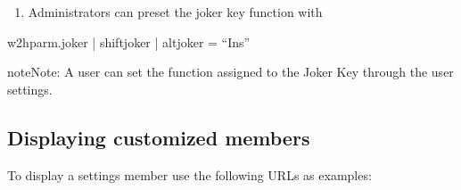 \documentclass[letterpaper,10pt,english]{sphinxmanual}
\begin{document}
\begin{sphinxVerbatim}[commandchars=\\\{\}]
\end{sphinxVerbatim}
\begin{enumerate}
%
\setcounter{enumi}{2}
\item {} 
\sphinxAtStartPar
Administrators can preset the joker key function with

\end{enumerate}
\begin{description}
\sphinxlineitem{::}
\sphinxAtStartPar
w2hparm.joker | shiftjoker | altjoker = “Ins”

\end{description}

\begin{sphinxadmonition}{note}{Note:}
\sphinxAtStartPar
A user can set the function assigned to the Joker Key through the user settings.
\end{sphinxadmonition}

\sphinxAtStartPar
{}

\ignorespaces 

\subsection{Displaying customized members}
\label{\detokenize{Customization:displaying-customized-members}}\label{\detokenize{Customization:index-2}}
\sphinxAtStartPar
To display a settings member use the following URLs as examples:

\begin{sphinxVerbatim}[commandchars=\\\{\}]
\end{sphinxVerbatim}

\sphinxAtStartPar
{}
\end{document}
